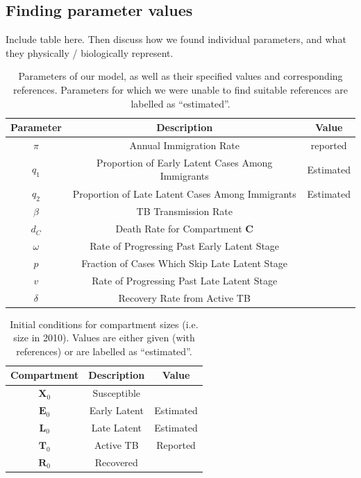 \documentclass[sn-mathphys,Numbered]{sn-jnl}%
\newcommand{\cX}{\mathbf{X}}
\newcommand{\cE}{\mathbf{E}}
\newcommand{\cL}{\mathbf{L}}
\newcommand{\cT}{\mathbf{T}}
\newcommand{\cR}{\mathbf{R}}
\theoremstyle{thmstyleone}%
\theoremstyle{thmstyletwo}%
\theoremstyle{thmstylethree}%
\begin{document}
\subsection{Finding parameter values}

Include table here.  Then discuss how we found individual parameters, and what they physically / biologically represent.







\begin{table}
    \centering
    \begin{tabular}{ccc}
        Parameter & Description & Value \\
        \hline
        $\pi$ & Annual Immigration Rate & reported \cite{https://www150.statcan.gc.ca/n1/pub/11-630-x/11-630-x2016006-eng.htm}\\
        $q_1$ & Proportion of Early Latent Cases Among Immigrants & Estimated \\
        $q_2$ & Proportion of Late Latent Cases Among Immigrants & Estimated \\
        $\beta$ & TB Transmission Rate & \\
        $d_C$ & Death Rate for Compartment $\mathbf{C}$ & \\
        $\omega$ & Rate of Progressing Past Early Latent Stage & \\
        $p$ & Fraction of Cases Which Skip Late Latent Stage &\\
        $v$ & Rate of Progressing Past Late Latent Stage &\\
        $\delta$ & Recovery Rate from Active TB&
    \end{tabular}
    \caption{Parameters of our model, as well as their specified values and corresponding references. Parameters for which we were unable to find suitable references are labelled as ``estimated''.}
    \label{tab:pars}
\end{table}

\begin{table}
    \centering
    \begin{tabular}{ccc}
    Compartment & Description & Value\\
    \hline
    $\cX_0$ & Susceptible & \\
    $\cE_0$ & Early Latent & Estimated\\
    $\cL_0$ & Late Latent & Estimated\\
    $\cT_0$ & Active TB & Reported \\
    $\cR_0$ & Recovered & 
    \end{tabular}
    \caption{Initial conditions for compartment sizes (i.e. size in 2010). Values are either given (with references) or are labelled as ``estimated''.}
    \label{tab:init}
\end{table}
\end{document}
